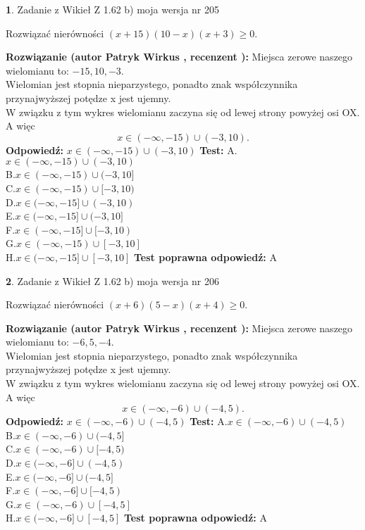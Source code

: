 \documentclass[12pt, a4paper]{article}
\theoremstyle{definition} %
\newtheorem{zad}{}
\newcommand{\zadStart}[1]{\begin{zad}#1\newline}
\newcommand{\zadStop}{\end{zad}}
\newcommand{\rozwStart}[2]{\noindent \textbf{Rozwiązanie (autor #1 , recenzent #2): }\newline}
\newcommand{\rozwStop}{\newline}
\newcommand{\odpStart}{\noindent \textbf{Odpowiedź:}\newline}
\newcommand{\odpStop}{\newline}
\newcommand{\testStart}{\noindent \textbf{Test:}\newline}
\newcommand{\testStop}{\newline}
\newcommand{\kluczStart}{\noindent \textbf{Test poprawna odpowiedź:}\newline}
\newcommand{\kluczStop}{\newline}
\begin{document}
\zadStart{Zadanie z Wikieł Z 1.62 b) moja wersja nr 205}

Rozwiązać nierówności $(x+15)(10-x)(x+3)\ge0$.
\zadStop
\rozwStart{Patryk Wirkus}{}
Miejsca zerowe naszego wielomianu to: $-15, 10, -3$.\\
Wielomian jest stopnia nieparzystego, ponadto znak współczynnika przy\linebreak najwyższej potędze x jest ujemny.\\ W związku z tym wykres wielomianu zaczyna się od lewej strony powyżej osi OX. A więc $$x \in (-\infty,-15) \cup (-3,10).$$
\rozwStop
\odpStart
$x \in (-\infty,-15) \cup (-3,10)$
\odpStop
\testStart
A.$x \in (-\infty,-15) \cup (-3,10)$\\
B.$x \in (-\infty,-15) \cup (-3,10]$\\
C.$x \in (-\infty,-15) \cup [-3,10)$\\
D.$x \in (-\infty,-15] \cup (-3,10)$\\
E.$x \in (-\infty,-15] \cup (-3,10]$\\
F.$x \in (-\infty,-15] \cup [-3,10)$\\
G.$x \in (-\infty,-15) \cup [-3,10]$\\
H.$x \in (-\infty,-15] \cup [-3,10]$
\testStop
\kluczStart
A
\kluczStop



\zadStart{Zadanie z Wikieł Z 1.62 b) moja wersja nr 206}

Rozwiązać nierówności $(x+6)(5-x)(x+4)\ge0$.
\zadStop
\rozwStart{Patryk Wirkus}{}
Miejsca zerowe naszego wielomianu to: $-6, 5, -4$.\\
Wielomian jest stopnia nieparzystego, ponadto znak współczynnika przy\linebreak najwyższej potędze x jest ujemny.\\ W związku z tym wykres wielomianu zaczyna się od lewej strony powyżej osi OX. A więc $$x \in (-\infty,-6) \cup (-4,5).$$
\rozwStop
\odpStart
$x \in (-\infty,-6) \cup (-4,5)$
\odpStop
\testStart
A.$x \in (-\infty,-6) \cup (-4,5)$\\
B.$x \in (-\infty,-6) \cup (-4,5]$\\
C.$x \in (-\infty,-6) \cup [-4,5)$\\
D.$x \in (-\infty,-6] \cup (-4,5)$\\
E.$x \in (-\infty,-6] \cup (-4,5]$\\
F.$x \in (-\infty,-6] \cup [-4,5)$\\
G.$x \in (-\infty,-6) \cup [-4,5]$\\
H.$x \in (-\infty,-6] \cup [-4,5]$
\testStop
\kluczStart
A
\kluczStop
\end{document}
